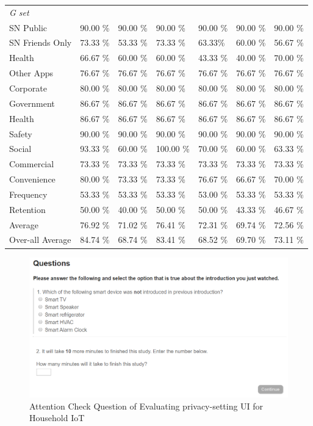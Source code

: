 \begin{appendices}
\begin{table}
\begin{tabular}{P{2.5cm}P{1.7cm}P{1.6cm}P{1.5cm}P{1.5cm}P{1.5cm}P{1.9cm}}
\textit{G set}\\
SN Public &90.00 \% &90.00 \% &90.00 \%  & 90.00 \% &90.00 \% &90.00 \%\\
SN Friends Only &73.33 \% &53.33 \% &73.33 \% & 63.33\% &60.00 \% &56.67 \%\\
Health &66.67 \% &60.00 \% &60.00 \%  & 43.33 \% &40.00 \% &70.00 \%\\
Other Apps &76.67 \% &76.67 \% &76.67 \% & 76.67 \% & 76.67 \% &76.67 \%\\
Corporate & 80.00 \% & 80.00 \% & 80.00 \% & 80.00 \% & 80.00 \% & 80.00 \%\\
Government &86.67 \% & 86.67 \% &86.67 \% & 86.67 \% & 86.67 \% &86.67 \%\\
Health &86.67 \% &86.67 \% &86.67 \% & 86.67 \% & 86.67 \% &86.67 \%\\
Safety &90.00 \% & 90.00 \% & 90.00 \%  & 90.00 \% & 90.00 \% &90.00 \%\\
Social &93.33 \% &60.00 \% &100.00 \% & 70.00 \% & 60.00 \% &63.33 \%\\
Commercial & 73.33 \% & 73.33 \% & 73.33 \% & 73.33 \% & 73.33 \%&73.33 \%\\
Convenience & 80.00 \% & 73.33 \% &73.33 \% & 76.67 \% & 66.67 \% & 70.00 \%\\
Frequency & 53.33 \% & 53.33 \% &53.33 \% & 53.00 \% & 53.33 \% & 53.33 \%\\
Retention &50.00 \% & 40.00 \% & 50.00 \% & 50.00 \% & 43.33 \% & 46.67 \%\\

\cmidrule(r){2-7}
Average & 76.92 \% & 71.02 \% & 76.41 \% & 72.31 \% & 69.74 \% & 72.56 \%\\
\cmidrule(r){1-7}
Over-all Average & 84.74 \% & 68.74 \% & 83.41 \% & 68.52 \% & 69.70 \% & 73.11 \%  \\
\end{tabular}
\end{table}

\begin{figure}
	\centering
	\includegraphics[width=\textwidth]{figures/yangAttentionCheck.png}
	\caption{Attention Check Question of Evaluating privacy-setting UI for Household IoT}
	\label{fig:yangAttentionCheck}
\end{figure}


\end{appendices}
